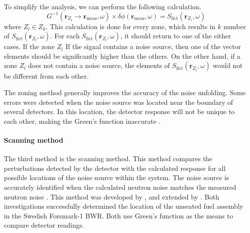 To simplify the analysis, we can perform the following calculation.
\begin{equation}
    G^{-1}(\textbf{r}_{Z_l} \rightarrow \textbf{r}_{\text{meas}}, \omega) \times \delta \phi (\textbf{r}_{\text{meas}},\omega) = S_{\text{fict}}(\textbf{r}_{Z_l}, \omega)
    \label{eq:zoning_simple}
\end{equation}
where $Z_l \in Z_k$. This calculation is done for every zone, which results in $k$ number of $S_{\text{fict}}(\textbf{r}_{Z_l}, \omega)$. For each $S_{\text{fict}}(\textbf{r}_{Z_l}, \omega)$, it should return to one of the either cases. If the zone $Z_l$ If the signal contains a noise source, then one of the vector elements should be significantly higher than the others. On the other hand, if a zone $Z_l$ does not contain a noise source, the elements of $S_{\text{fict}}(\textbf{r}_{Z_l}, \omega)$ would not be different from each other.

The zoning method generally improves the accuracy of the noise unfolding. Some errors were detected when the noise source was located near the boundary of several detectors. In this location, the detector response will not be unique to each other, making the Green’s function inaccurate \cite{demaziereIdentificationLocalizationAbsorbers2005}.

\paragraph{Scanning method}

The third method is the scanning method. This method compares the perturbations detected by the detector with the calculated response for all possible locations of the noise source within the system. The noise source is accurately identified when the calculated neutron noise matches the measured neutron noise \cite{demaziereIdentificationLocalizationAbsorbers2005}. This method was developed by \cite{karlssonLocalizationChannelInstability1999}, and extended by \cite{demaziereDevelopmentNoisebasedMethod2002}. Both investigations successfully determined the location of the unseated fuel assembly in the Swedish Forsmark-1 BWR. Both use Green’s function as the means to compare detector readings.

